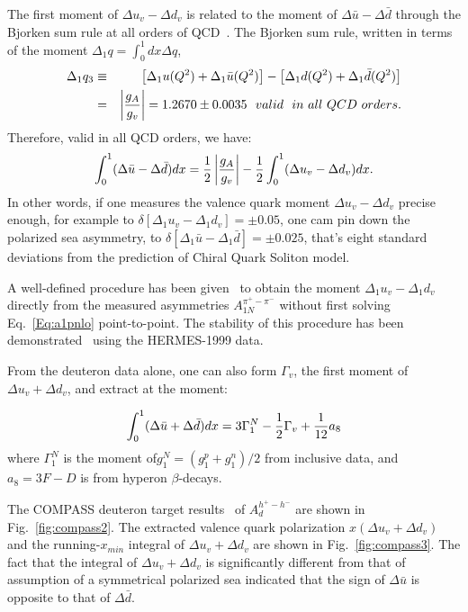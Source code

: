 The first moment of $\Delta u_v - \Delta d_v$ is related to the moment 
of $\Delta \bar{u} -\Delta \bar{d}$ through the Bjorken sum rule at all orders of QCD~\cite{ssissakian2}.
The Bjorken sum rule, written in terms of 
the moment $\Delta_1 q=\int_0^1dx \Delta q$,
\begin{eqnarray}
\label{Eq:bsr1}
\Delta_1 q_3 & \equiv & \left[ \Delta_1 u(Q^2)+ \Delta_1 \bar{u}(Q^2) \right] - 
\left[ \Delta_1 d(Q^2)+ \Delta_1 \bar{d}(Q^2) \right] \nonumber \\
 & =& \left| {g_A \over g_v} \right| =1.2670 \pm 0.0035 ~~valid~~ in ~ all ~ QCD ~ orders. 
\end{eqnarray}
Therefore, valid in all QCD orders, we have:
\begin{eqnarray}
\label{Eq:bsr2}
\int_0^1(\Delta \bar{u}  - \Delta \bar{d})dx = {1 \over 2} \left| {g_A \over g_v} \right|
- {1 \over 2} \int_0^1(\Delta {u_v}  - \Delta {d_v} )dx.
\end{eqnarray}
%
In other words, if one  measures the valence quark moment $\Delta {u_v}  - \Delta {d_v}$ precise enough, for example to 
$\delta \left[ \Delta_1 u_v - \Delta_1 d_v \right] = \pm 0.05$,  
one cam pin down the polarized sea asymmetry, to $\delta \left[ \Delta_1 \bar{u} - \Delta_1 \bar{d} \right] = \pm 0.025$, that's 
 eight standard deviations from the prediction of Chiral Quark Soliton model.

A well-defined procedure has been given~\cite{ssissakian2}
 to obtain the moment $\Delta_1 {u_v}  - \Delta_1 {d_v}$ directly
 from the measured asymmetries $A_{1N}^{\pi^+ - \pi^-}$ without 
first solving Eq.~\ref{Eq:a1pnlo} point-to-point. 
The stability of this procedure has been demonstrated~\cite{ssissakian2}
using the HERMES-1999 data.

From the deuteron data alone, one can also form $\Gamma_v$, the first moment of $\Delta u_v + \Delta d_v$, and extract
at \lo the moment:

\begin{equation}
 \int_0^1 (\Delta \bar{u} +\Delta \bar{d})dx = 3 \Gamma_1^N -{1 \over 2}\Gamma_v+{1 \over 12} a_8 
\end{equation}
where $\Gamma_1^N$ is the moment of$g_1^N=(g_1^p+g_1^n)/2$ from inclusive data, and $a_8=3F-D$ is from hyperon $\beta$-decays.

The  COMPASS deuteron target results~\cite{compass2007} of $A_d^{h^+ - h^-}$ are shown in Fig.~\ref{fig:compass2}. The extracted valence
quark polarization $x(\Delta u_v + \Delta d_v)$ and the running-$x_{min}$ integral of $\Delta u_v + \Delta d_v$ are 
shown in Fig.~\ref{fig:compass3}.  The fact that the integral of $\Delta u_v + \Delta d_v$ is significantly different from that of 
assumption of a symmetrical polarized sea indicated that the sign of $\Delta \bar{u}$ is opposite to that of $\Delta \bar{d}$.       

